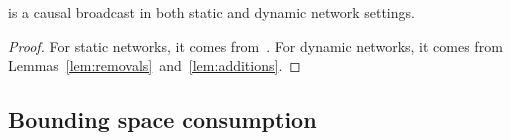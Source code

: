 
\begin{theorem}
  \CBROADCAST is a causal broadcast in both static and dynamic network settings.
\end{theorem}

\begin{proof}
  For static networks, it comes from~\cite{friedman2004causal}. For dynamic
  networks, it comes from Lemmas~\ref{lem:removals}~and~\ref{lem:additions}.
\end{proof}

\subsection{Bounding space consumption}

